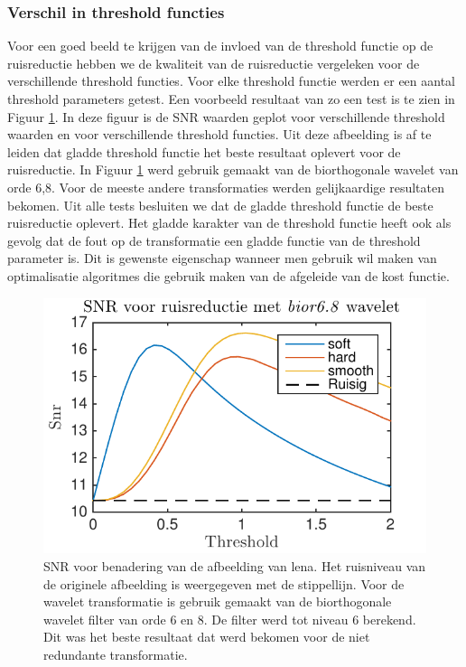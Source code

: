 \subsubsection{Verschil in threshold functies}

Voor een goed beeld te krijgen van de invloed van de threshold functie op de ruisreductie hebben we de kwaliteit van de ruisreductie vergeleken voor de verschillende threshold functies.
Voor elke threshold functie werden er een aantal threshold parameters getest.
Een voorbeeld resultaat van zo een test is te zien in Figuur \ref{fig:snr_image_bior6}.
In deze figuur is de SNR waarden geplot voor  verschillende threshold waarden en voor verschillende threshold functies.
Uit deze afbeelding is af te leiden dat gladde threshold functie het beste resultaat oplevert voor de ruisreductie.
In Figuur \ref{fig:snr_image_bior6} werd gebruik gemaakt van de biorthogonale wavelet van orde 6,8.
Voor de meeste andere transformaties werden gelijkaardige resultaten bekomen.
Uit alle tests besluiten  we dat de gladde threshold functie de beste ruisreductie oplevert.
Het gladde karakter van de threshold functie heeft ook als gevolg dat de fout op de transformatie een gladde functie van de threshold parameter is.
Dit is gewenste eigenschap wanneer men gebruik wil maken van optimalisatie algoritmes die gebruik maken van de afgeleide van de kost functie.


\begin{figure}
\centering
\includegraphics[width=0.7\linewidth]{../src/denoising/image/snr_image_bior68_30.pdf}
\caption{SNR voor benadering van de afbeelding van lena. Het ruisniveau van de originele afbeelding is weergegeven met de stippellijn. Voor de wavelet transformatie is gebruik gemaakt van de biorthogonale wavelet filter van orde 6 en 8. De filter werd tot niveau 6 berekend. Dit was het beste resultaat dat werd bekomen voor de niet redundante transformatie.}
\label{fig:snr_image_bior6}
\end{figure}


